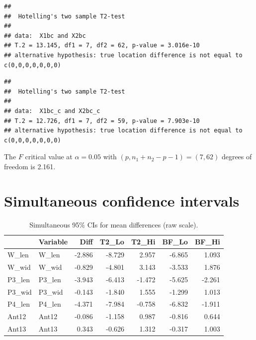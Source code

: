 \documentclass[
  11pt,
]{article}
\begin{document}
\begin{verbatim}
## 
##  Hotelling's two sample T2-test
## 
## data:  X1bc and X2bc
## T.2 = 13.145, df1 = 7, df2 = 62, p-value = 3.016e-10
## alternative hypothesis: true location difference is not equal to c(0,0,0,0,0,0,0)
\end{verbatim}

\begin{verbatim}
## 
##  Hotelling's two sample T2-test
## 
## data:  X1bc_c and X2bc_c
## T.2 = 12.726, df1 = 7, df2 = 59, p-value = 7.903e-10
## alternative hypothesis: true location difference is not equal to c(0,0,0,0,0,0,0)
\end{verbatim}

The \(F\) critical value at \(\alpha = 0.05\) with
\((p, n_1+n_2-p-1) = (7, 62)\) degrees of freedom is 2.161.

\section{Simultaneous confidence
intervals}\label{simultaneous-confidence-intervals}

\begin{longtable}[t]{llrrrrr}
\caption{\label{tab:ci-tbl-raw}Simultaneous 95\% CIs for mean differences (raw scale).}\\
\toprule
 & Variable & Diff & T2\_Lo & T2\_Hi & BF\_Lo & BF\_Hi\\
\midrule
W\_len & W\_len & -2.886 & -8.729 & 2.957 & -6.865 & 1.093\\
W\_wid & W\_wid & -0.829 & -4.801 & 3.143 & -3.533 & 1.876\\
P3\_len & P3\_len & -3.943 & -6.413 & -1.472 & -5.625 & -2.261\\
P3\_wid & P3\_wid & -0.143 & -1.840 & 1.555 & -1.299 & 1.013\\
P4\_len & P4\_len & -4.371 & -7.984 & -0.758 & -6.832 & -1.911\\
\addlinespace
Ant12 & Ant12 & -0.086 & -1.158 & 0.987 & -0.816 & 0.644\\
Ant13 & Ant13 & 0.343 & -0.626 & 1.312 & -0.317 & 1.003\\
\bottomrule
\end{longtable}
\end{document}

